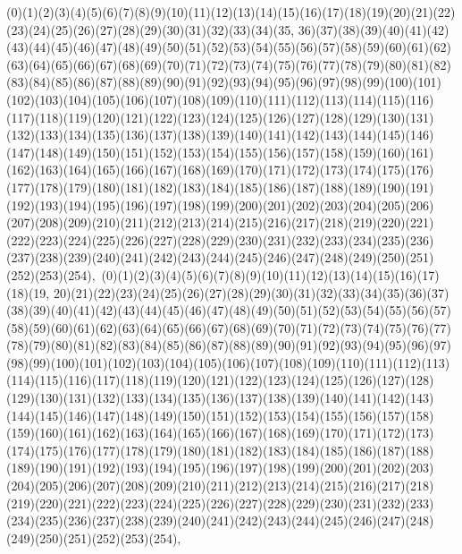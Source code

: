 \documentclass[12pt]{article}
\begin{document}
{(0)(1)(2)(3)(4)(5)(6)(7)(8)(9)(10)(11)(12)(13)(14)(15)(16)(17)(18)(19)(20)(21)(22)(23)(24)(25)(26)(27)(28)(29)(30)(31)(32)(33)(34)(35, 36)(37)(38)(39)(40)(41)(42)(43)(44)(45)(46)(47)(48)(49)(50)(51)(52)(53)(54)(55)(56)(57)(58)(59)(60)(61)(62)(63)(64)(65)(66)(67)(68)(69)(70)(71)(72)(73)(74)(75)(76)(77)(78)(79)(80)(81)(82)(83)(84)(85)(86)(87)(88)(89)(90)(91)(92)(93)(94)(95)(96)(97)(98)(99)(100)(101)(102)(103)(104)(105)(106)(107)(108)(109)(110)(111)(112)(113)(114)(115)(116)(117)(118)(119)(120)(121)(122)(123)(124)(125)(126)(127)(128)(129)(130)(131)(132)(133)(134)(135)(136)(137)(138)(139)(140)(141)(142)(143)(144)(145)(146)(147)(148)(149)(150)(151)(152)(153)(154)(155)(156)(157)(158)(159)(160)(161)(162)(163)(164)(165)(166)(167)(168)(169)(170)(171)(172)(173)(174)(175)(176)(177)(178)(179)(180)(181)(182)(183)(184)(185)(186)(187)(188)(189)(190)(191)(192)(193)(194)(195)(196)(197)(198)(199)(200)(201)(202)(203)(204)(205)(206)(207)(208)(209)(210)(211)(212)(213)(214)(215)(216)(217)(218)(219)(220)(221)(222)(223)(224)(225)(226)(227)(228)(229)(230)(231)(232)(233)(234)(235)(236)(237)(238)(239)(240)(241)(242)(243)(244)(245)(246)(247)(248)(249)(250)(251)(252)(253)(254)$
, 
$
(0)(1)(2)(3)(4)(5)(6)(7)(8)(9)(10)(11)(12)(13)(14)(15)(16)(17)(18)(19, 20)(21)(22)(23)(24)(25)(26)(27)(28)(29)(30)(31)(32)(33)(34)(35)(36)(37)(38)(39)(40)(41)(42)(43)(44)(45)(46)(47)(48)(49)(50)(51)(52)(53)(54)(55)(56)(57)(58)(59)(60)(61)(62)(63)(64)(65)(66)(67)(68)(69)(70)(71)(72)(73)(74)(75)(76)(77)(78)(79)(80)(81)(82)(83)(84)(85)(86)(87)(88)(89)(90)(91)(92)(93)(94)(95)(96)(97)(98)(99)(100)(101)(102)(103)(104)(105)(106)(107)(108)(109)(110)(111)(112)(113)(114)(115)(116)(117)(118)(119)(120)(121)(122)(123)(124)(125)(126)(127)(128)(129)(130)(131)(132)(133)(134)(135)(136)(137)(138)(139)(140)(141)(142)(143)(144)(145)(146)(147)(148)(149)(150)(151)(152)(153)(154)(155)(156)(157)(158)(159)(160)(161)(162)(163)(164)(165)(166)(167)(168)(169)(170)(171)(172)(173)(174)(175)(176)(177)(178)(179)(180)(181)(182)(183)(184)(185)(186)(187)(188)(189)(190)(191)(192)(193)(194)(195)(196)(197)(198)(199)(200)(201)(202)(203)(204)(205)(206)(207)(208)(209)(210)(211)(212)(213)(214)(215)(216)(217)(218)(219)(220)(221)(222)(223)(224)(225)(226)(227)(228)(229)(230)(231)(232)(233)(234)(235)(236)(237)(238)(239)(240)(241)(242)(243)(244)(245)(246)(247)(248)(249)(250)(251)(252)(253)(254)$
, 
$
}
\end{document}

